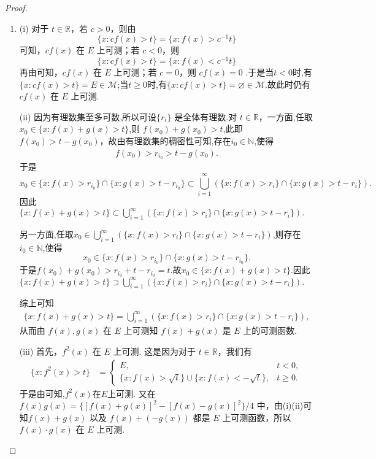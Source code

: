 \documentclass[../../main.tex]{subfiles}
\begin{document}
\begin{proof}
\begin{enumerate}[(1)]
\item (i) 对于 \(t \in \mathbb{R}\)，若 \(c > 0\)，则由
\[
\{x: cf(x) > t\} = \{x: f(x) > c^{-1}t\}
\]
可知，\(cf(x)\) 在 \(E\) 上可测；若 \(c < 0\)，则
\[
\{x: cf(x) > t\} = \{x: f(x) < c^{-1}t\}
\]
再由可知，\(cf(x)\) 在 \(E\) 上可测；若 \(c = 0\)，则 \(cf(x) = 0\) .于是当$t<0$时,有
$\{x:cf(x)>t\}=E\in \mathscr{M}$;当$t\geqslant 0$时,有$\{x:cf(x)>t\}=\varnothing\in \mathscr{M}$.故此时仍有\(cf(x)\) 在 \(E\) 上可测.

(ii) 因为有理数集至多可数,所以可设\(\{r_i\}\) 是全体有理数.对 \(t \in \mathbb{R}\)，一方面,任取$x_0\in \{x: f(x) + g(x) > t\}$,则 \(f(x_0) + g(x_0) > t\),此即 \(f(x_0) > t - g(x_0)\)，故由有理数集的稠密性可知,存在$i_0\in\mathbb{N}$,使得
\begin{align*}
f(x_0)>r_{i_0}>t-g(x_0).
\end{align*}
于是$$x_0\in \{x:f(x)>r_{i_0}\}\cap \{x: g(x) > t - r_{i_0}\}\subset \bigcup_{i = 1}^{\infty}(\{x: f(x) > r_i\} \cap \{x: g(x) > t - r_i\}).$$因此$\{x: f(x) + g(x) > t\} 
\subset \bigcup_{i = 1}^{\infty}(\{x: f(x) > r_i\} \cap \{x: g(x) > t - r_i\}).$

另一方面,任取$x_0\in  \bigcup_{i = 1}^{\infty}(\{x: f(x) > r_i\} \cap \{x: g(x) > t - r_i\})$,则存在$i_0\in \mathbb{N}$,使得
\[
x_0\in\{x:f(x)>r_{i_0}\}\cap \{x: g(x) > t - r_{i_0}\}.
\]
于是$f(x_0)+g(x_0)>r_{i_0}+t-r_{i_0}=t$.故$x_0\in \{x: f(x) + g(x) > t\} $.因此$\{x: f(x) + g(x) > t\} 
\supset \bigcup_{i = 1}^{\infty}(\{x: f(x) > r_i\} \cap \{x: g(x) > t - r_i\}).$

综上可知
\begin{align*}
\{x: f(x) + g(x) > t\} 
= \bigcup_{i = 1}^{\infty}(\{x: f(x) > r_i\} \cap \{x: g(x) > t - r_i\}),
\end{align*}
从而由 \(f(x),g(x)\) 在 \(E\) 上可测知 \(f(x) + g(x)\) 是 \(E\) 上的可测函数.

(iii) 首先，\(f^2(x)\) 在 \(E\) 上可测. 这是因为对于 \(t \in \mathbb{R}\)，我们有
\begin{align*}
\{x: f^2(x) > t\} 
&= 
\begin{cases}
E, & t < 0,\\
\{x: f(x) > \sqrt{t}\} \cup \{x: f(x) < -\sqrt{t}\}, & t \geqslant 0.
\end{cases}
\end{align*}
于是由可知,$f^2(x)$在$E$上可测.
又在 \(f(x)g(x) = \{[f(x) + g(x)]^2 - [f(x) - g(x)]^2\}/4\) 中，由(i)(ii)可知\(f(x) + g(x)\) 以及 \(f(x) + (-g(x))\) 都是 \(E\) 上可测函数，所以 \(f(x)\cdot g(x)\) 在 \(E\) 上可测.


\end{enumerate}
\end{proof}
\end{document}
